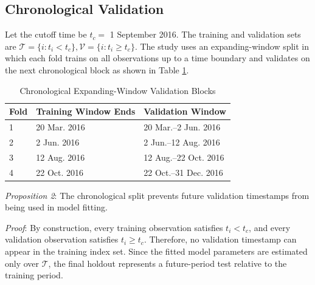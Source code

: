 \documentclass[conference]{IEEEtran}
\begin{document}
\subsection{Chronological Validation}
Let the cutoff time be $t_c=$ 1 September 2016. The training and validation sets are $\mathcal{T}=\{i:t_i<t_c\},\mathcal{V}=\{i:t_i\geq t_c\}$.
The study uses an expanding-window split in which each fold trains on all observations up to a time boundary and validates on the next chronological block as shown in Table \ref{tab:cv}.

\begin{table}[!t]
\caption{Chronological Expanding-Window Validation Blocks}
\label{tab:cv}
\centering
\begin{tabular}{lll}
\toprule
\textbf{Fold} & \textbf{Training Window Ends} & \textbf{Validation Window} \\
\midrule
1 & 20 Mar. 2016 & 20 Mar.--2 Jun. 2016 \\
2 & 2 Jun. 2016 & 2 Jun.--12 Aug. 2016 \\
3 & 12 Aug. 2016 & 12 Aug.--22 Oct. 2016 \\
4 & 22 Oct. 2016 & 22 Oct.--31 Dec. 2016 \\
\bottomrule
\end{tabular}
\end{table}

\textit{Proposition 2}: The chronological split prevents future validation timestamps from being used in model fitting.

\textit{Proof}: By construction, every training observation satisfies $t_i<t_c$, and every validation observation satisfies $t_i\geq t_c$. Therefore, no validation timestamp can appear in the training index set. Since the fitted model parameters are estimated only over $\mathcal{T}$, the final holdout represents a future-period test relative to the training period.
\end{document}
